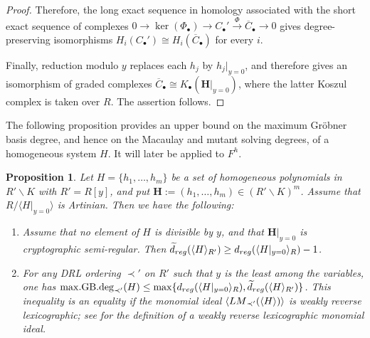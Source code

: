 \documentclass{article}
\newtheorem{proposition}[theorem]{Proposition}
\theoremstyle{definition}
\theoremstyle{plain}
\theoremstyle{plain}
\theoremstyle{plain}
\theoremstyle{plain}
\numberwithin{equation}{subsection}
\begin{document}
\begin{proof}
Therefore, the long exact sequence in homology associated with the short exact sequence of complexes $0\longrightarrow \ker(\Phi_\bullet) \longrightarrow C_\bullet' \xrightarrow{\ \Phi\ } \overline C_\bullet \longrightarrow0$ gives degree-preserving isomorphisms $H_i(C_\bullet') \cong H_i(\overline C_\bullet)$ for every $i$.

Finally, reduction modulo $y$ replaces each $h_j$ by
$h_j|_{y=0}$, and therefore gives an isomorphism of graded complexes $\overline C_\bullet \cong K_\bullet(\bm H|_{y=0})$, where the latter Koszul complex is taken over $R$.
The assertion follows.
\end{proof}

The following proposition provides an upper bound on the maximum Gr\"obner basis degree, and hence on the Macaulay and mutant solving degrees, of a homogeneous system $H$.
It will later be applied to $F^h$.

\begin{proposition}\label{prop:new}
Let $H = \{ h_1, \ldots, h_m \}$ be a set of homogeneous polynomials in $R' \smallsetminus K$ with $R'=R[y]$, and put $\bm{H}:=(h_1,\ldots,h_m) \in (R' \smallsetminus K)^m$.
Assume that $R/\langle H|_{y=0}\rangle$ is Artinian.
Then we have the following:
\begin{enumerate}
    \item[(1)] Assume that no element of $H$ is divisible by $y$, and that $\bm H|_{y=0}$ is cryptographic semi-regular.
    Then $\widetilde{d}_{\rm reg}( \langle H \rangle_{R'}) \ge d_{\rm reg}(\langle H|_{y=0} \rangle_R)-1$.

    \item[(2)] For any DRL ordering $\prec'$ on $R'$ such that $y$ is the least among the variables, one has $\mathrm{max.GB.deg}_{\prec'} (H ) \leq \max \{ {d}_{\rm reg}(\langle H|_{y=0} \rangle_{R}), \widetilde{d}_{\rm reg}( \langle H \rangle_{R'}) \}$. 
    This inequality is an equality if the monomial ideal $\langle {\rm LM}_{\prec'}(\langle H\rangle)\rangle $ is weakly reverse lexicographic;
    see \cite[Section~4]{Pardue} for the definition of a weakly reverse lexicographic monomial ideal.
\end{enumerate}
\end{proposition}
\end{document}
